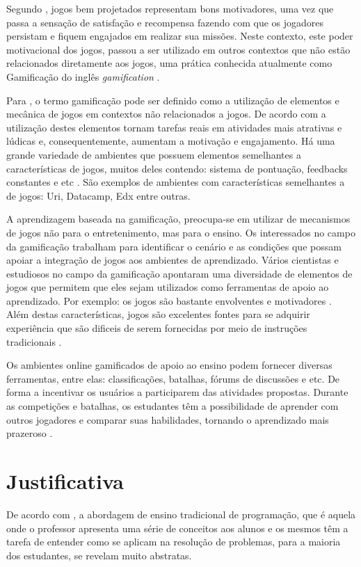 Segundo , jogos bem projetados representam bons motivadores, uma vez que passa a sensação de satisfação
e recompensa fazendo com que os jogadores persistam e fiquem engajados em realizar sua missões. Neste contexto, este poder
motivacional dos jogos, passou a ser utilizado em outros contextos que não estão relacionados diretamente aos jogos, uma prática 
conhecida atualmente como Gamificação do inglês \textit{gamification} {\itshape}.

Para , o termo gamificação pode ser definido como a utilização de elementos e mecânica de 
jogos em contextos não relacionados a jogos. De acordo com  a utilização destes elementos tornam tarefas reais em atividades
mais atrativas e lúdicas e, consequentemente, aumentam a motivação e engajamento. Há uma grande variedade de ambientes que possuem 
elementos semelhantes a características de jogos, muitos deles contendo: sistema de pontuação, feedbacks constantes e 
etc \cite{6624228}. São exemplos de ambientes com características semelhantes a de jogos: Uri, Datacamp, Edx entre outras.

A aprendizagem baseada na gamificação, preocupa-se em utilizar de mecanismos de jogos não para o entretenimento,
mas para o ensino. Os interessados no campo da gamificação trabalham para identificar o cenário e as condições 
que possam apoiar a integração de jogos aos ambientes de aprendizado. Vários cientistas e estudiosos no campo
da gamificação apontaram uma diversidade de elementos de jogos que permitem que eles sejam utilizados como
ferramentas de apoio ao aprendizado. Por exemplo: os jogos são bastante envolventes \cite{Dickey2005} e motivadores \cite{Prensky:2003:DGL:950566.950596}. Além destas características,
jogos são excelentes fontes para se adquirir experiência que são dificeis de serem fornecidas por meio de instruções tradicionais \cite{Arena2014}.

Os ambientes online gamificados de apoio ao ensino podem fornecer diversas ferramentas, entre elas: classificações, batalhas, fórums de discussões e etc.
De forma a incentivar os usuários a participarem das atividades propostas. 
Durante as competições e batalhas, os estudantes têm a possibilidade de aprender com outros jogadores e comparar suas habilidades, tornando o aprendizado mais
prazeroso \cite{LearningProgramming}. 

\pagebreak

\section{Justificativa}
De acordo com , a abordagem de ensino tradicional de programação, que é aquela onde o professor apresenta
uma série de conceitos aos alunos e os mesmos têm a tarefa de entender como se aplicam na resolução de problemas,
para a maioria dos estudantes, se revelam muito abstratas.

